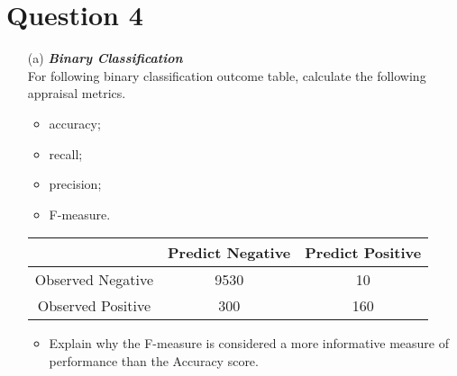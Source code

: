 



\newpage
\section*{Question 4 }

\begin{itemize}

\item[(a)] \textbf{\textit{Binary Classification }}\\
For following binary classification outcome table, calculate the following appraisal metrics.
\begin{itemize}	

\item 	accuracy;

\item 	recall;

\item 	precision;

\item  	F-measure.
\end{itemize}	

\begin{center}
\begin{tabular}{|c|c|c|}
\hline  & \phantom{spa}Predict Negative\phantom{spa} & \phantom{spa}Predict Positive\phantom{spa} \\ 
\hline\phantom{spa} Observed Negative \phantom{spa}&	9530	&	10	\\ 
\hline \phantom{spa}Observed Positive\phantom{spa} & 	300	&	160	\\ 
\hline 
\end{tabular} 
\end{center}

\begin{itemize}	

\item   Explain why the F-measure is considered a more informative measure of performance than the Accuracy score.


\end{itemize}
\end{itemize}
